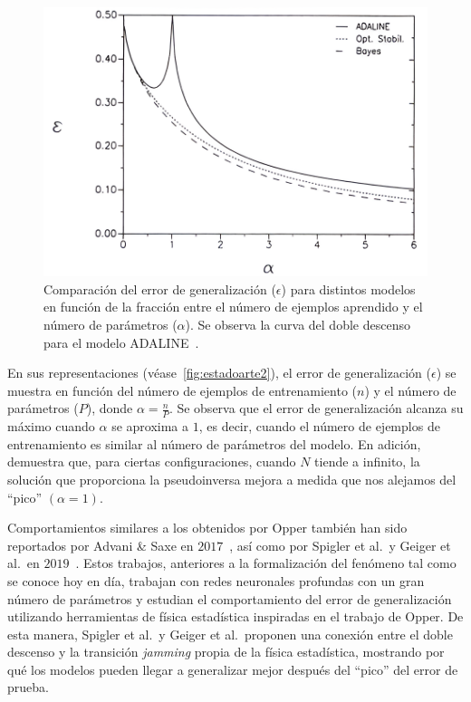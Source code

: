 \begin{figure}[h]
    \centering
    \includegraphics[width=0.8\linewidth]{img/estadoarte2.png}
    \caption[Deep Double Descent presente en ADALINE.]{Comparación del error de generalización ($\epsilon$) para distintos modelos en función de la fracción entre el número de ejemplos aprendido y el número de parámetros ($\alpha$). Se observa la curva del doble descenso para el modelo ADALINE~\cite{Opper1995}.}\label{fig:estadoarte2}
\end{figure}

En sus representaciones (véase~\autoref{fig:estadoarte2}), el error de generalización ($\epsilon$) se muestra en función del número de ejemplos de entrenamiento ($n$) y el número de parámetros ($P$), donde $\alpha = \frac{n}{P}$. Se observa que el error de generalización alcanza su máximo cuando $\alpha$ se aproxima a $1$, es decir, cuando el número de ejemplos de entrenamiento es similar al número de parámetros del modelo. En adición, demuestra que, para ciertas configuraciones, cuando $N$ tiende a infinito, la solución que proporciona la pseudoinversa mejora a medida que nos alejamos del ``pico'' $(\alpha = 1)$. \newline

Comportamientos similares a los obtenidos por Opper también han sido reportados por Advani \& Saxe en $2017$~\cite{Advani2017}, así como por Spigler et al.\ y Geiger et al.\ en $2019$~\cite{Spigler2019, Geiger2019}. Estos trabajos, anteriores a la formalización del fenómeno tal como se conoce hoy en día, trabajan con redes neuronales profundas con un gran número de parámetros y estudian el comportamiento del error de generalización utilizando herramientas de física estadística inspiradas en el trabajo de Opper. De esta manera, Spigler et al.\ y Geiger et al.\ proponen una conexión entre el doble descenso y la transición \textit{jamming} propia de la física estadística, mostrando por qué los modelos pueden llegar a generalizar mejor después del ``pico'' del error de prueba.\newline

